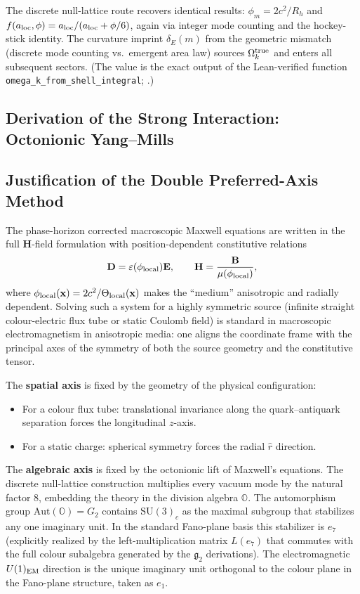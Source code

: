 \documentclass[12pt,a4paper]{article}
\begin{document}
The discrete null-lattice route recovers identical results: $\phi_m=2c^2/R_h$ and $f(a_{\rm loc},\phi) = a_{\rm loc}/(a_{\rm loc} + \phi/6)$, again via integer mode counting and the hockey-stick identity. The curvature imprint $\delta_E(m)$ from the geometric mismatch (discrete mode counting vs.\ emergent area law) sources \(\Omega_k^{\rm true}\) and enters all subsequent sectors. (The value is the exact output of the Lean-verified function \texttt{omega\_k\_from\_shell\_integral}; \citep{hqiv-lean}.)

\subsection{Derivation of the Strong Interaction: Octonionic Yang--Mills}

\subsection{Justification of the Double Preferred-Axis Method}
\label{sec:double-preferred-axis}
The phase-horizon corrected macroscopic Maxwell equations are written in the full $\mathbf{H}$-field formulation with position-dependent constitutive relations
\[
\mathbf{D} = \varepsilon(\phi_{\rm local})\mathbf{E}, \qquad
\mathbf{H} = \frac{\mathbf{B}}{\mu(\phi_{\rm local})},
\]
where $\phi_{\rm local}(\mathbf{x}) = 2c^2 / \Theta_{\rm local}(\mathbf{x})$ makes the ``medium'' anisotropic and radially dependent. Solving such a system for a highly symmetric source (infinite straight colour-electric flux tube or static Coulomb field) is standard in macroscopic electromagnetism in anisotropic media: one aligns the coordinate frame with the principal axes of the symmetry of both the source geometry and the constitutive tensor.

The \textbf{spatial axis} is fixed by the geometry of the physical configuration:
\begin{itemize}
\item For a colour flux tube: translational invariance along the quark--antiquark separation forces the longitudinal $z$-axis.
\item For a static charge: spherical symmetry forces the radial $\hat{r}$ direction.
\end{itemize}

The \textbf{algebraic axis} is fixed by the octonionic lift of Maxwell's equations. The discrete null-lattice construction multiplies every vacuum mode by the natural factor 8, embedding the theory in the division algebra $\mathbb{O}$. The automorphism group $\mathrm{Aut}(\mathbb{O}) = G_2$ contains $\mathrm{SU}(3)_c$ as the maximal subgroup that stabilizes any one imaginary unit. In the standard Fano-plane basis this stabilizer is $e_7$ (explicitly realized by the left-multiplication matrix $L(e_7)$ that commutes with the full colour subalgebra generated by the $\mathfrak{g}_2$ derivations). The electromagnetic $U(1)_{\rm EM}$ direction is the unique imaginary unit orthogonal to the colour plane in the Fano-plane structure, taken as $e_1$.
\end{document}
